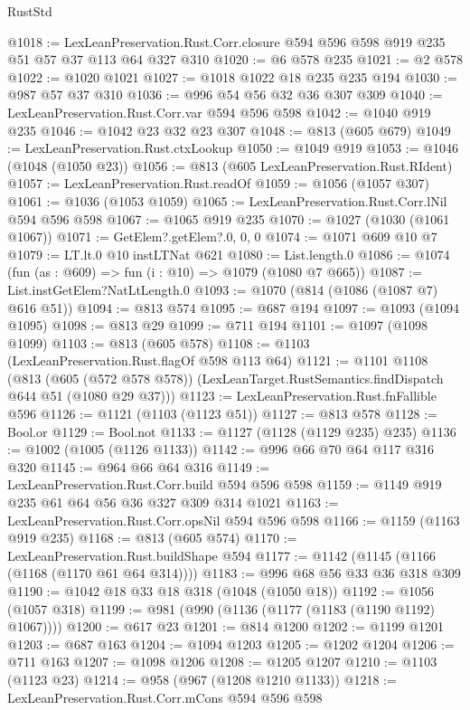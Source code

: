 \begin{lexlean}{RustStd}
\begin{coremodule}
@1018 := LexLeanPreservation.Rust.Corr.closure
    @594
    @596
    @598
    @919
    @235
    @51
    @57
    @37
    @113
    @64
    @327
    @310
@1020 := @6 @578 @235
@1021 := @2 @578
@1022 := @1020 @1021
@1027 := @1018 @1022 @18 @235 @235 @194
@1030 := @987 @57 @37 @310
@1036 := @996 @54 @56 @32 @36 @307 @309
@1040 := LexLeanPreservation.Rust.Corr.var @594 @596 @598
@1042 := @1040 @919 @235
@1046 := @1042 @23 @32 @23 @307
@1048 := @813 (@605 @679)
@1049 := LexLeanPreservation.Rust.ctxLookup
@1050 := @1049 @919
@1053 := @1046 (@1048 (@1050 @23))
@1056 := @813 (@605 LexLeanPreservation.Rust.RIdent)
@1057 := LexLeanPreservation.Rust.readOf
@1059 := @1056 (@1057 @307)
@1061 := @1036 (@1053 @1059)
@1065 := LexLeanPreservation.Rust.Corr.lNil @594 @596 @598
@1067 := @1065 @919 @235
@1070 := @1027 (@1030 (@1061 @1067))
@1071 := GetElem?.getElem?.{0, 0, 0}
@1074 := @1071 @609 @10 @7
@1079 := LT.lt.{0} @10 instLTNat @621
@1080 := List.length.{0}
@1086 := @1074 (fun (as : @609) => fun (i : @10) => @1079 (@1080 @7 @665))
@1087 := List.instGetElem?NatLtLength.{0}
@1093 := @1070 (@814 (@1086 (@1087 @7) @616 @51))
@1094 := @813 @574
@1095 := @687 @194
@1097 := @1093 (@1094 @1095)
@1098 := @813 @29
@1099 := @711 @194
@1101 := @1097 (@1098 @1099)
@1103 := @813 (@605 @578)
@1108 := @1103 (LexLeanPreservation.Rust.flagOf @598 @113 @64)
@1121 := @1101
    @1108
    (@813
      (@605 (@572 @578 @578))
      (LexLeanTarget.RustSemantics.findDispatch @644 @51 (@1080 @29 @37)))
@1123 := LexLeanPreservation.Rust.fnFallible @596
@1126 := @1121 (@1103 (@1123 @51))
@1127 := @813 @578
@1128 := Bool.or
@1129 := Bool.not
@1133 := @1127 (@1128 (@1129 @235) @235)
@1136 := @1002 (@1005 (@1126 @1133))
@1142 := @996 @66 @70 @64 @117 @316 @320
@1145 := @964 @66 @64 @316
@1149 := LexLeanPreservation.Rust.Corr.build @594 @596 @598
@1159 := @1149 @919 @235 @61 @64 @56 @36 @327 @309 @314 @1021
@1163 := LexLeanPreservation.Rust.Corr.opsNil @594 @596 @598
@1166 := @1159 (@1163 @919 @235)
@1168 := @813 (@605 @574)
@1170 := LexLeanPreservation.Rust.buildShape @594
@1177 := @1142 (@1145 (@1166 (@1168 (@1170 @61 @64 @314))))
@1183 := @996 @68 @56 @33 @36 @318 @309
@1190 := @1042 @18 @33 @18 @318 (@1048 (@1050 @18))
@1192 := @1056 (@1057 @318)
@1199 := @981 (@990 (@1136 (@1177 (@1183 (@1190 @1192) @1067))))
@1200 := @617 @23
@1201 := @814 @1200
@1202 := @1199 @1201
@1203 := @687 @163
@1204 := @1094 @1203
@1205 := @1202 @1204
@1206 := @711 @163
@1207 := @1098 @1206
@1208 := @1205 @1207
@1210 := @1103 (@1123 @23)
@1214 := @958 (@967 (@1208 @1210 @1133))
@1218 := LexLeanPreservation.Rust.Corr.mCons @594 @596 @598

\end{coremodule}
\end{lexlean}

